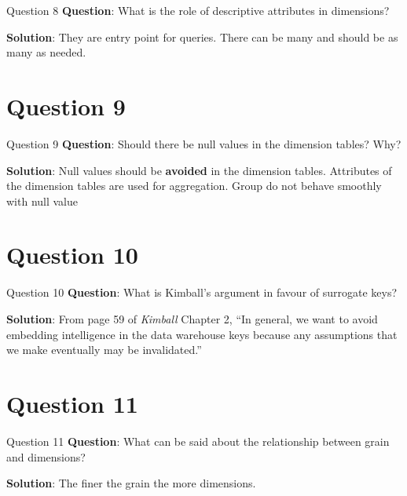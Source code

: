 \begin{frame}[fragile]{Question 8}
	\textbf{Question}: What is the role of descriptive attributes in dimensions?\\\vspace{10pt}
	
	\textbf{Solution}: They are entry point for queries. There can be many and should be as many as needed.
\end{frame}

\section*{Question 9}

\begin{frame}[fragile]{Question 9}
	\textbf{Question}: Should there be null values in the dimension tables? Why? \\\vspace{10pt}
	
	\textbf{Solution}: Null values should be \textbf{avoided} in the dimension tables. Attributes of the dimension tables are used for aggregation. Group do not behave smoothly with null value
\end{frame}

\section*{Question 10}

\begin{frame}[fragile]{Question 10}
	\textbf{Question}: What is Kimball's argument in favour of surrogate keys?\\\vspace{10pt}
	
	\textbf{Solution}: From page 59 of \textit{Kimball} Chapter 2, ``In general, we want to avoid embedding intelligence in the data warehouse keys because any assumptions that we make eventually may be invalidated.''
\end{frame}

\section*{Question 11}

\begin{frame}[fragile]{Question 11}
	\textbf{Question}: What can be said about the relationship between grain and dimensions? \\\vspace{10pt}
	
	\textbf{Solution}: The finer the grain the more dimensions.
\end{frame}

